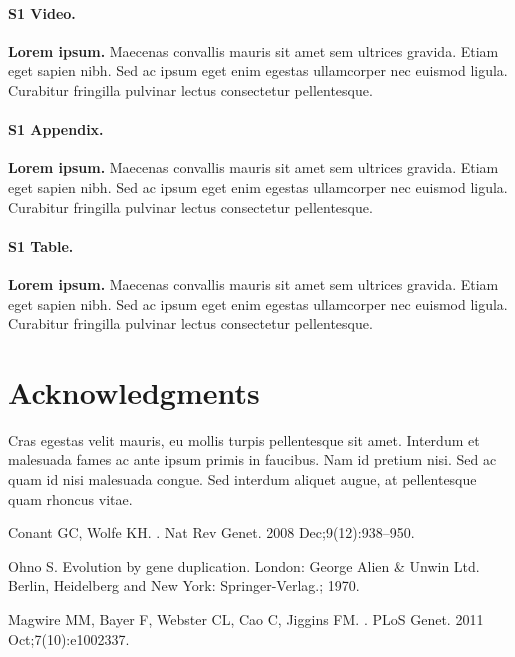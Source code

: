 \documentclass[10pt,letterpaper]{article}
\begin{document}
\paragraph*{S1 Video.}
\label{S1_Video}
{\bf Lorem ipsum.}  Maecenas convallis mauris sit amet sem ultrices gravida. Etiam eget sapien nibh. Sed ac ipsum eget enim egestas ullamcorper nec euismod ligula. Curabitur fringilla pulvinar lectus consectetur pellentesque.

\paragraph*{S1 Appendix.}
\label{S1_Appendix}
{\bf Lorem ipsum.} Maecenas convallis mauris sit amet sem ultrices gravida. Etiam eget sapien nibh. Sed ac ipsum eget enim egestas ullamcorper nec euismod ligula. Curabitur fringilla pulvinar lectus consectetur pellentesque.

\paragraph*{S1 Table.}
\label{S1_Table}
{\bf Lorem ipsum.} Maecenas convallis mauris sit amet sem ultrices gravida. Etiam eget sapien nibh. Sed ac ipsum eget enim egestas ullamcorper nec euismod ligula. Curabitur fringilla pulvinar lectus consectetur pellentesque.

\section*{Acknowledgments}
Cras egestas velit mauris, eu mollis turpis pellentesque sit amet. Interdum et malesuada fames ac ante ipsum primis in faucibus. Nam id pretium nisi. Sed ac quam id nisi malesuada congue. Sed interdum aliquet augue, at pellentesque quam rhoncus vitae.

\nolinenumbers

%
%
% 
\begin{thebibliography}{10}

Conant GC, Wolfe KH.
.
\newblock Nat Rev Genet. 2008 Dec;9(12):938--950.

Ohno S.
\newblock Evolution by gene duplication.
\newblock London: George Alien \& Unwin Ltd. Berlin, Heidelberg and New York:
  Springer-Verlag.; 1970.

Magwire MM, Bayer F, Webster CL, Cao C, Jiggins FM.
.
\newblock PLoS Genet. 2011 Oct;7(10):e1002337.

\end{thebibliography}
\end{document}
